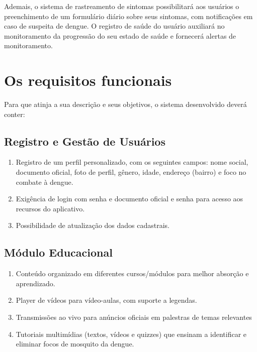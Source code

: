 \documentclass[a5paper, 12pt]{article}
\begin{document}
Ademais, o sistema de rastreamento de sintomas possibilitará aos usuários o preenchimento de um formulário diário sobre seus sintomas, com notificações em caso de suspeita de dengue. O registro de saúde do usuário auxiliará no monitoramento da progressão do seu estado de saúde e fornecerá alertas de monitoramento.

\section{Os requisitos funcionais}
Para que atinja a sua descrição e seus objetivos, o sistema desenvolvido deverá conter:

\subsection{Registro e Gestão de Usuários}
\begin{enumerate}
    \item Registro de um perfil personalizado, com os seguintes campos: nome social, documento oficial, foto de perfil, gênero, idade, endereço (bairro) e foco no combate à dengue.
    \item Exigência de login com senha e documento oficial e senha para acesso aos recursos do aplicativo.
    \item Possibilidade de atualização dos dados cadastrais.
\end{enumerate}

\subsection{Módulo Educacional}
\begin{enumerate}
    \item Conteúdo organizado em diferentes cursos/módulos para melhor absorção e aprendizado.
    \item Player de vídeos para vídeo-aulas, com suporte a legendas.
    \item Transmissões ao vivo para anúncios oficiais em palestras de temas relevantes
    \item Tutoriais multimídias (textos, vídeos e quizzes) que ensinam a identificar e eliminar focos de mosquito da dengue.
\end{enumerate}
\end{document}
